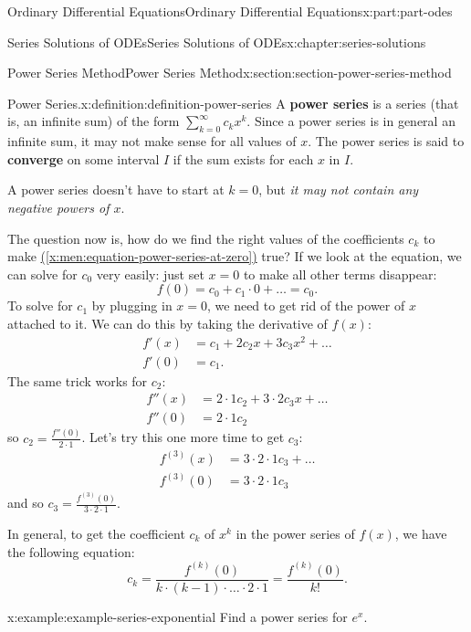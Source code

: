 \documentclass[oneside,10pt,]{book}
\newcommand{\xreffont}{\relax}
\newcommand{\terminology}[1]{\textbf{#1}}
\numberwithin{equation}{part}
\newcommand{\amp}{&}
\begin{document}
\begin{partptx}{Ordinary Differential Equations}{}{Ordinary Differential Equations}{}{}{x:part:part-odes}
\begin{chapterptx}{Series Solutions of ODEs}{}{Series Solutions of ODEs}{}{}{x:chapter:series-solutions}
\begin{sectionptx}{Power Series Method}{}{Power Series Method}{}{}{x:section:section-power-series-method}
\begin{definition}{Power Series.}{x:definition:definition-power-series}
A \terminology{power series} is a series (that is, an infinite sum) of the form \(\sum_{k=0}^{\infty}c_{k}x^{k}\). Since a power series is in general an infinite sum, it may not make sense for all values of \(x\). The power series is said to \terminology{converge} on some interval \(I\) if the sum exists for each \(x\) in \(I\).%
\end{definition}
A power series doesn't have to start at \(k=0\), but \emph{it may not contain any negative powers of \(x\)}.%
\par
The question now is, how do we find the right values of the coefficients \(c_{k}\) to make \hyperref[x:men:equation-power-series-at-zero]{({\xreffont\ref{x:men:equation-power-series-at-zero}})} true? If we look at the equation, we can solve for \(c_{0}\) very easily: just set \(x=0\) to make all other terms disappear:%
\begin{equation*}
f(0) = c_{0} + c_{1}\cdot0+\dots = c_{0}.
\end{equation*}
To solve for \(c_{1}\) by plugging in \(x=0\), we need to get rid of the power of \(x\) attached to it. We can do this by taking the derivative of \(f(x)\):%
\begin{align*}
f'(x) \amp= c_{1} + 2c_{2}x + 3c_{3}x^{2} + \dots\\
f'(0) \amp= c_{1}\text{.}
\end{align*}
The same trick works for \(c_{2}\):%
\begin{align*}
f''(x) \amp= 2\cdot1c_{2} + 3\cdot2c_{3}x+\dots\\
f''(0) \amp= 2\cdot1c_{2}
\end{align*}
so \(c_{2} = \frac{f''(0)}{2\cdot1}\). Let's try this one more time to get \(c_{3}\):%
\begin{align*}
f^{(3)}(x) \amp= 3\cdot2\cdot1c_{3} + \dots\\
f^{(3)}(0) \amp= 3\cdot2\cdot1c_{3}
\end{align*}
and so \(c_{3} = \frac{f^{(3)}(0)}{3\cdot2\cdot1}\).%
\par
In general, to get the coefficient \(c_{k}\) of \(x^{k}\) in the power series of \(f(x)\), we have the following equation:%
%
\begin{equation}
c_{k} = \frac{f^{(k)}(0)}{k\cdot(k-1)\cdot\dots\cdot2\cdot1} = \frac{f^{(k)}(0)}{k!}.\label{x:men:equation-power-series-coefficients-at-zero}
\end{equation}
\begin{example}{}{x:example:example-series-exponential}%
Find a power series for \(e^{x}\).%
\par\smallskip%

\end{example}
\end{sectionptx}
\end{chapterptx}
\end{partptx}
\end{document}
